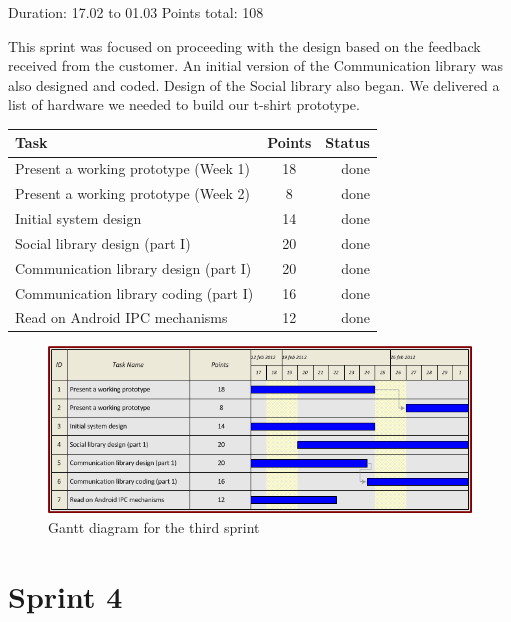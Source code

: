 Duration: 17.02 to 01.03
Points total: 108

This sprint was focused on proceeding with the design based on the
feedback received from the customer. An initial version of the Communication
library was also designed and coded. Design of the Social library also began.
We delivered a list of hardware we needed to build our t-shirt prototype.

\begin{table}[ht!]
\begin{tabular}{ | l | c | r | }

\hline
\textbf{Task} & \textbf{Points} & \textbf{Status} \\
\hline

Present a working prototype (Week 1)		& 18 & done \\
\hline
Present a working prototype (Week 2)		& 8  & done \\
\hline
Initial system design				& 14 & done \\
\hline
Social library design (part I)			& 20 & done \\
\hline
Communication library design (part I)		& 20 & done \\
\hline
Communication library coding (part I) 		& 16 & done \\
\hline
Read on Android IPC mechanisms			& 12 & done \\
\hline

\end{tabular}
\end{table}

\begin{figure}[h!]
\centering \includegraphics[scale=0.8]{img/sprints-gantt3.png}
\caption{Gantt diagram for the third sprint}
\label{fig:sprints-gantt3}
\end{figure}

\newpage


\section{Sprint 4}

